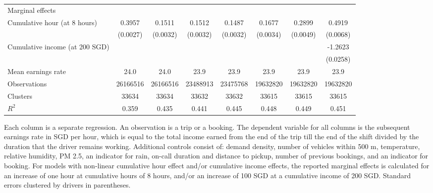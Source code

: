 \documentclass[reviewmode,AEJ]{AEA}
\begin{document}
\begin{table}
\begin{tabularx}{\textwidth}{l@{\extracolsep{\fill}}*{7}{S}}
        \midrule
        Marginal effects & & & & & &\\
        \quad Cumulative hour (at 8 hours)&      0.3957&      0.1511&      0.1512&      0.1487&      0.1677&      0.2899&      0.4919\\
                    &    (0.0027)&    (0.0032)&    (0.0032)&    (0.0032)&    (0.0034)&    (0.0049)&    (0.0068)\\
        \addlinespace
        \quad Cumulative income (at 200 SGD)&            &            &            &            &            &            &     -1.2623\\
                    &            &            &            &            &            &            &    (0.0258)\\
        \addlinespace
        Mean earnings rate&        24.0&        24.0&        23.9&        23.9&        23.9&        23.9&        23.9\\
        Observations&\num{26166516}&\num{26166516}&\num{23488913}&\num{23475768}&\num{19632820}&\num{19632820}&\num{19632820}\\
        Clusters    & \num{33634}& \num{33634}& \num{33632}& \num{33632}& \num{33615}& \num{33615}& \num{33615}\\
        \(R^2\)     &       0.359&       0.435&       0.441&       0.445&       0.448&       0.449&       0.451\\
        \bottomrule
    \end{tabularx}

	\begin{tablenotes}
    Each column is a separate regression. An observation is a trip or a booking. The dependent variable for all columns is the subsequent earnings rate in SGD per hour, which is equal to the total income earned from the end of the trip till the end of the shift divided by the duration that the driver remains working. Additional controls consist of: demand density, number of vehicles within 500 m, temperature, relative humidity, PM 2.5, an indicator for rain, on-call duration and distance to pickup, number of previous bookings, and an indicator for booking. For models with non-linear cumulative hour effect and/or cumulative income effects, the reported marginal effects is calculated for an increase of one hour at cumulative hours of 8 hours, and/or an increase of 100 SGD at a cumulative income of 200 SGD.  Standard errors clustered by drivers in parentheses. 
	\end{tablenotes}
\end{table}
\end{document}
